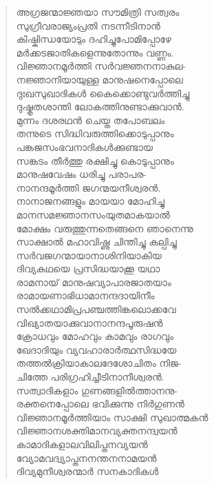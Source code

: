 \begin{verse}
അഗ്രജന്മാജ്ഞയാ സൗമിത്രി സത്വരം\\
സുഗ്രീവരാജ്യംപ്രതി നടന്നീടിനാന്‍\\
കിഷ്കിന്ധയോടും ദഹിച്ചുപോമിപ്പോഴേ\\
മര്‍ക്കടജാതികളെന്നുതോന്നും വണ്ണം.\\
വിജ്ഞാനമൂര്‍ത്തി സര്‍വജ്ഞനനാകുല-\\
നജ്ഞാനിയായുള്ള മാനുഷനെപ്പോലെ\\
ദുഃഖസുഖാദികള്‍ കൈക്കൊണ്ടുവര്‍ത്തിച്ചു\\
ദുഷ്കൃതശാന്തി ലോകത്തിനുണ്ടാക്കുവാന്‍.\\
മുന്നം ദശരഥന്‍ ചെയ്ത തപോബലം\\
തന്നുടെ സിദ്ധിവരുത്തിക്കൊടുപ്പാനും\\
പങ്കജസംഭവനാദികള്‍ക്കുണ്ടായ\\
സങ്കടം തീര്‍ത്തു രക്ഷിച്ചു കൊടുപ്പാനും\\
മാനുഷവേഷം ധരിച്ചു പരാപര-\\
നാനന്ദമൂര്‍ത്തി ജഗന്മയനീശ്വരന്‍.\\
നാനാജനങ്ങളും മായയാ മോഹിച്ചു\\
മാനസമജ്ഞാനസംയുതമാകയാല്‍\\
മോക്ഷം വരുത്തുന്നതെങ്ങനെ ഞാനെന്നു\\
സാക്ഷാല്‍ മഹാവിഷ്ണു ചിന്തിച്ചു കല്പിച്ചു\\
സര്‍വജഗന്മായാനാശിനിയാകിയ\\
ദിവ്യകഥയെ പ്രസിദ്ധയാക്കൂ യഥാ\\
രാമനായ് മാനുഷവ്യാപാരജാതയാം\\
രാമായണാഭിധാമാനന്ദദായിനീം\\
സല്‍ക്കഥാമിപ്രപഞ്ചത്തിങ്കലൊക്കവേ\\
വിഖ്യാതയാക്കുവാനാനന്ദപൂരുഷന്‍\\
ക്രോധവും മോഹവും കാമവും രാഗവും\\
ഖേദാദിയും വ്യവഹാരാര്‍ത്ഥസിദ്ധയേ\\
തത്തല്‍ക്രിയാകാലദേശോചിതം നിജ-\\
ചിത്തേ പരിഗ്രഹിച്ചീടിനാനീശ്വരന്‍.\\
സത്വാദികളാം ഗുണങ്ങളില്‍ത്താനനു-\\
രക്തനെപ്പോലെ ഭവിക്കുന്നു നിര്‍ഗുണന്‍\\
വിജ്ഞാനമൂര്‍ത്തിയാം സാക്ഷി സുഖാത്മകന്‍\\
വിജ്ഞാനശക്തിമാനവ്യക്തനന്ദ്വയന്‍\\
കാമാദികളാലവിലിപ്തനവ്യയന്‍\\
വ്യോമവദ്വ്യാപ്തനനന്തനനാമയന്‍\\
ദിവ്യമുനീശ്വരന്മാര്‍ സനകാദികള്‍\\

\end{verse}
